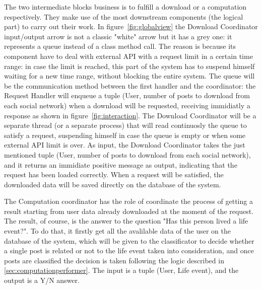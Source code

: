 The two intermediate blocks business is to fulfill a download or a computation respectively. They make use of the most downstream components (the logical part) to carry out their work. In figure~\ref{fig:globalview} the Download Coordinator input/output arrow is not a classic "white" arrow but it has a grey one: it represents a queue instead of a class method call. The reason is because its component have to deal with external API with a request limit in a certain time range: in case the limit is reached, this part of the system has to suspend himself waiting for a new time range, without blocking the entire system. The queue will be the communication method between the first handler and the coordinator: the Request Handler will enqueue a tuple (User, number of posts to download from each social network) when a download will be requested, receiving immidiatly a response as shown in figure~\ref{fig:interaction}. The Download Coordinator will be a separate thread (or a separate process) that will read continuosly the queue to satisfy a request, suspending himself in case the queue is empty or when some external API limit is over. As input, the Download Coordinator takes the just mentioned tuple (User, number of posts to download from each social network), and it returns an immidiate positive message as output, indicating that the request has been loaded correctly. When a request will be satisfied, the downloaded data will be saved directly on the database of the system.

The Computation coordinator has the role of coordinate the process of getting a result starting from user data already downloaded at the moment of the request. The result, of course, is the answer to the question "Has this person lived a life event?". To do that, it firstly get all the avalilable data of the user on the database of the system, which will be given to the classificator to decide whether a single post is related or not to the life event taken into consideration, and once posts are classified the decision is taken following the logic described in \ref{sec:computationperformer}. The input is a tuple (User, Life event), and the output is a Y/N answer.

